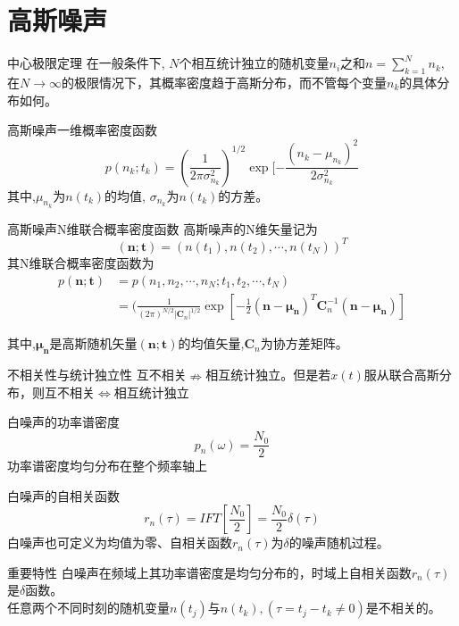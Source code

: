 \section{高斯噪声}

\begin{frame}
\begin{block}{中心极限定理}
	在一般条件下, $N$个相互统计独立的随机变量$n_i$之和$n=\sum\limits_{k=1}^{N}n_k$, 在$N\to\infty$的极限情况下，其概率密度趋于高斯分布，而不管每个变量$n_k$的具体分布如何。
\end{block}
\begin{block}{高斯噪声一维概率密度函数}
	\[p(n_k;t_k)=(\frac{1}{2\pi\sigma_{n_k}^2})^{1/2}\exp[-\frac{(n_k-\mu_{n_k})^2}{2\sigma_{n_k}^2} \]
	其中,$\mu_{n_k}$为$n(t_k)$的均值, $\sigma_{n_k}$为$n(t_k)$的方差。
\end{block}
\end{frame}

\begin{frame}
\begin{block}{高斯噪声N维联合概率密度函数}
	高斯噪声的N维矢量记为
	\[(\mathbf{n;t})=(n(t_1),n(t_2),\cdots,n(t_N))^T \]
	其N维联合概率密度函数为
	\begin{align*}
	p(\mathbf{n;t})&=p(n_1,n_2,\cdots,n_N; t_1,t_2,\cdots,t_N)\\
	&=(\frac{1}{(2\pi)^{N/2}|\mathbf{C}_n|^{1/2}}\exp[-\frac{1}{2}(\mathbf{n-\mu_n})^T\mathbf{C}_n^{-1}(\mathbf{n-\mu_n})]
	\end{align*}
	
	其中,$\mathbf{\mu_{n}}$是高斯随机矢量$(\mathbf{n;t})$的均值矢量,$\mathbf{C}_n$为协方差矩阵。
\end{block}
\begin{block}{不相关性与统计独立性}
	互不相关$\nRightarrow$相互统计独立。但是若$x(t)$服从联合高斯分布，则互不相关$\Leftrightarrow$相互统计独立
\end{block}
\end{frame}

\begin{frame}
\begin{block}{白噪声的功率谱密度}
	\[p_n(\omega)=\frac{N_0}{2}\]
	功率谱密度均匀分布在整个频率轴上
\end{block}
\begin{block}{白噪声的自相关函数}
	\[r_n(\tau)=IFT[\frac{N_0}{2}]=\frac{N_0}{2}\delta(\tau)\]
	白噪声也可定义为均值为零、自相关函数$r_n(\tau)$为$\delta$的噪声随机过程。
\end{block}
\begin{block}{重要特性}
	白噪声在频域上其功率谱密度是均匀分布的，时域上自相关函数$r_n(\tau)$是$\delta$函数。\\
	任意两个不同时刻的随机变量$n(t_j)$与$n(t_k),(\tau=t_j-t_k\ne 0)$是不相关的。
\end{block}
\end{frame}

